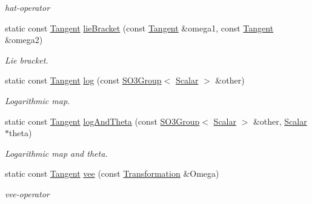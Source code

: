\begin{DoxyCompactItemize}
\begin{DoxyCompactList}\small\item\em hat-\/operator \end{DoxyCompactList}\item 
static const \hyperlink{class_sophus_1_1_s_o3_group_base_a11150229b6a471ae96cde974ece5ec7c}{Tangent} \hyperlink{class_sophus_1_1_s_o3_group_base_a42bf7d9f6ddb6c3e71070df9f4f64f82}{lie\+Bracket} (const \hyperlink{class_sophus_1_1_s_o3_group_base_a11150229b6a471ae96cde974ece5ec7c}{Tangent} \&omega1, const \hyperlink{class_sophus_1_1_s_o3_group_base_a11150229b6a471ae96cde974ece5ec7c}{Tangent} \&omega2)
\begin{DoxyCompactList}\small\item\em Lie bracket. \end{DoxyCompactList}\item 
static const \hyperlink{class_sophus_1_1_s_o3_group_base_a11150229b6a471ae96cde974ece5ec7c}{Tangent} \hyperlink{class_sophus_1_1_s_o3_group_base_ad88c991746d629cefa056a44ed91f902}{log} (const \hyperlink{class_sophus_1_1_s_o3_group}{S\+O3\+Group}$<$ \hyperlink{class_sophus_1_1_s_o3_group_base_a31bf31815c195b7150da8a8e8c6f0189}{Scalar} $>$ \&other)
\begin{DoxyCompactList}\small\item\em Logarithmic map. \end{DoxyCompactList}\item 
static const \hyperlink{class_sophus_1_1_s_o3_group_base_a11150229b6a471ae96cde974ece5ec7c}{Tangent} \hyperlink{class_sophus_1_1_s_o3_group_base_a4d568828a5967d08364aa6a3439ccb79}{log\+And\+Theta} (const \hyperlink{class_sophus_1_1_s_o3_group}{S\+O3\+Group}$<$ \hyperlink{class_sophus_1_1_s_o3_group_base_a31bf31815c195b7150da8a8e8c6f0189}{Scalar} $>$ \&other, \hyperlink{class_sophus_1_1_s_o3_group_base_a31bf31815c195b7150da8a8e8c6f0189}{Scalar} $\ast$theta)
\begin{DoxyCompactList}\small\item\em Logarithmic map and theta. \end{DoxyCompactList}\item 
static const \hyperlink{class_sophus_1_1_s_o3_group_base_a11150229b6a471ae96cde974ece5ec7c}{Tangent} \hyperlink{class_sophus_1_1_s_o3_group_base_aee724215d80386327f000bb0c5cc376c}{vee} (const \hyperlink{class_sophus_1_1_s_o3_group_base_aa20fc57bf1b355a6616f5c4b785f1fc5}{Transformation} \&Omega)
\begin{DoxyCompactList}\small\item\em vee-\/operator \end{DoxyCompactList}\end{DoxyCompactItemize}

